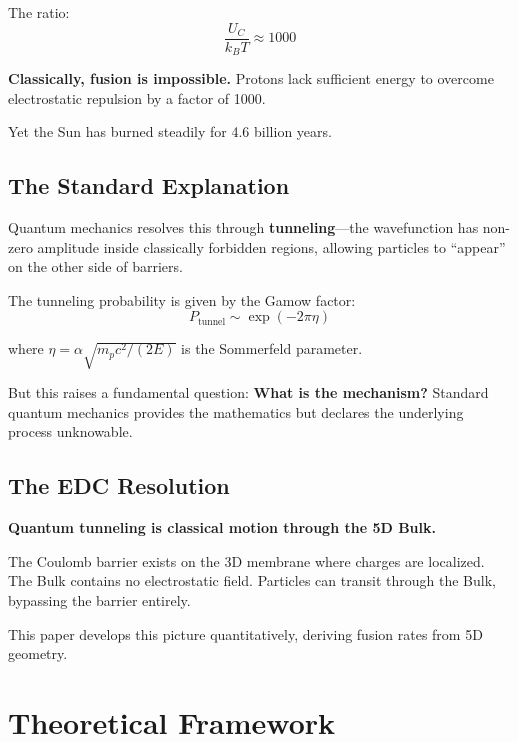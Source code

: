 \documentclass[12pt,a4paper]{article}
\begin{document}
The ratio:
\begin{equation}
\frac{U_C}{k_B T} \approx 1000
\end{equation}

\textbf{Classically, fusion is impossible.} Protons lack sufficient energy to overcome electrostatic repulsion by a factor of 1000.

Yet the Sun has burned steadily for 4.6 billion years.

\subsection{The Standard Explanation}

Quantum mechanics resolves this through \textbf{tunneling}---the wavefunction has non-zero amplitude inside classically forbidden regions, allowing particles to ``appear'' on the other side of barriers.

The tunneling probability is given by the Gamow factor:
\begin{equation}
P_{\text{tunnel}} \sim \exp\left(-2\pi\eta\right)
\end{equation}

where $\eta = \alpha\sqrt{m_p c^2/(2E)}$ is the Sommerfeld parameter.

But this raises a fundamental question: \textbf{What is the mechanism?} Standard quantum mechanics provides the mathematics but declares the underlying process unknowable.

\subsection{The EDC Resolution}

\begin{edcprinciple}
\textbf{Quantum tunneling is classical motion through the 5D Bulk.}

The Coulomb barrier exists on the 3D membrane where charges are localized. The Bulk contains no electrostatic field. Particles can transit through the Bulk, bypassing the barrier entirely.
\end{edcprinciple}

This paper develops this picture quantitatively, deriving fusion rates from 5D geometry.

\section{Theoretical Framework}
\end{document}
